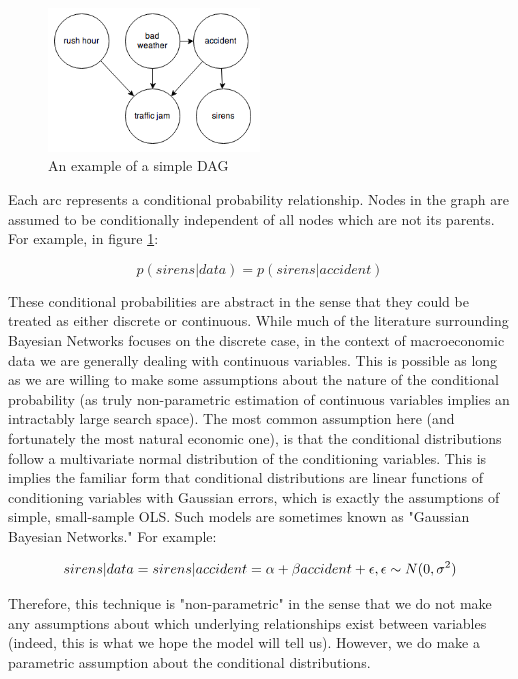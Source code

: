 \documentclass{article}
\begin{document}
\begin{figure}
\centering
\label{dag1}
\includegraphics[width=0.5\textwidth]{trafficjam.png}
\caption{An example of a simple DAG \cite{traffic_jam}}
\end{figure}

Each arc represents a conditional probability relationship. Nodes in the graph are assumed to be conditionally independent of all nodes which are not its parents. For example, in figure \ref{dag1}: 

\begin{equation}
    \label{eq1}
    p(sirens | data) = p(sirens | accident)
\end{equation}

These conditional probabilities are abstract in the sense that they could be treated as either discrete or continuous. While much of the literature surrounding Bayesian Networks focuses on the discrete case, in the context of macroeconomic data we are generally dealing with continuous variables. This is possible as long as we are willing to make some assumptions about the nature of the conditional probability (as truly non-parametric estimation of continuous variables implies an intractably large search space). The most common assumption here (and fortunately the most natural economic one), is that the conditional distributions follow a multivariate normal distribution of the conditioning variables. This is implies the familiar form that conditional distributions are linear functions of conditioning variables with Gaussian errors, which is exactly the assumptions of simple, small-sample OLS. Such models are sometimes known as "Gaussian Bayesian Networks." For example:

\begin{equation}
    \label{eq2}
    sirens|data = sirens|accident = \alpha + \beta accident + \epsilon, \space \epsilon \sim N(0, \sigma^2)
\end{equation}

Therefore, this technique is "non-parametric" in the sense that we do not make any assumptions about which underlying relationships exist between variables (indeed, this is what we hope the model will tell us). However, we do make a parametric assumption about the conditional distributions.
\end{document}

